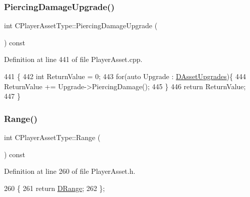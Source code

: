 \subsubsection{\texorpdfstring{Piercing\+Damage\+Upgrade()}{PiercingDamageUpgrade()}}
{\footnotesize\ttfamily int C\+Player\+Asset\+Type\+::\+Piercing\+Damage\+Upgrade (\begin{DoxyParamCaption}{ }\end{DoxyParamCaption}) const}



Definition at line 441 of file Player\+Asset.\+cpp.


\begin{DoxyCode}
441                                                  \{
442     \textcolor{keywordtype}{int} ReturnValue = 0;
443     \textcolor{keywordflow}{for}(\textcolor{keyword}{auto} Upgrade : \hyperlink{classCPlayerAssetType_aeb8d5c3ea81ea56248d02a5e24d48001}{DAssetUpgrades})\{
444         ReturnValue += Upgrade->PiercingDamage();
445     \}
446     \textcolor{keywordflow}{return} ReturnValue;
447 \}
\end{DoxyCode}
\hypertarget{classCPlayerAssetType_aa0e5a5e791c506dc5ac76d46ac6e719a}{}\label{classCPlayerAssetType_aa0e5a5e791c506dc5ac76d46ac6e719a} 
\subsubsection{\texorpdfstring{Range()}{Range()}}
{\footnotesize\ttfamily int C\+Player\+Asset\+Type\+::\+Range (\begin{DoxyParamCaption}{ }\end{DoxyParamCaption}) const\hspace{0.3cm}{\ttfamily [inline]}}



Definition at line 260 of file Player\+Asset.\+h.


\begin{DoxyCode}
260                          \{
261             \textcolor{keywordflow}{return} \hyperlink{classCPlayerAssetType_a1204a9470d8940fdb81a63670a0f6779}{DRange};  
262         \};
\end{DoxyCode}
\hypertarget{classCPlayerAssetType_a85643bb4b6dc70561603f6567bc7358a}{}\label{classCPlayerAssetType_a85643bb4b6dc70561603f6567bc7358a} 
